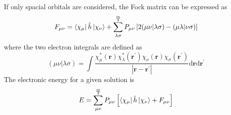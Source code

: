 \documentclass[final,3p,times,twocolumn]{elsarticle}
\newcommand{\ssth}{\textsuperscript{th}}
\begin{document}
If only spacial orbitals are considered, the Fock matrix can be expressed as
\begin{equation} \label{eq:fockmatspace}
\begin{gathered}
F_{\mu\nu} = \bra{\chi_\mu} \hat h \ket{\chi_\nu} + \sum_{\lambda\sigma}^{\frac{m}{2}} P_{\mu\nu} \left[ 2(\mu\nu|\lambda\sigma) - (\mu\lambda|\nu\sigma)\right]
\end{gathered}
\end{equation} 
where the two electron integrals are defined as
\begin{equation} \label{eq:2e}
(\mu\nu|\lambda\sigma) = \int \frac{\chi_\mu^*(\mathbf{r})\chi_\lambda^*(\mathbf{r}^\prime)\chi_\nu(\mathbf{r})\chi_\sigma(\mathbf{r}^\prime)}{|\mathbf{r}-\mathbf{r}^\prime|} \mathrm{d}\mathbf{r}\mathrm{d}\mathbf{r}^\prime
\end{equation}
The electronic energy for a given solution is
\begin{equation} \label{eq:hfenergy}
E = \sum_{\mu\nu}^{\frac{m}{2}} P_{\mu\nu} \left[ \bra{\chi_\mu} \hat h \ket{\chi_\nu} + F_{\mu\nu} \right]
\end{equation}

% 
% 
% 
% 
% 
% 
% 
%
%
\end{document}
